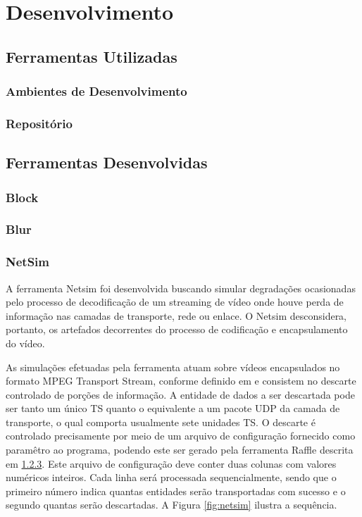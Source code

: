 
\chapter{Desenvolvimento} %

\section{Ferramentas Utilizadas}
\subsection{Ambientes de Desenvolvimento}
\subsection{Repositório}

\section{Ferramentas Desenvolvidas}
\subsection{Block}
\subsection{Blur}
\subsection{NetSim}

A ferramenta Netsim foi desenvolvida buscando simular degradações ocasionadas pelo processo de decodificação de um streaming de vídeo onde houve perda de informação nas camadas de transporte, rede ou enlace. O Netsim desconsidera, portanto, os artefados decorrentes do processo de codificação e encapsulamento do vídeo.

As simulações efetuadas pela ferramenta atuam sobre vídeos encapsulados no formato MPEG Transport Stream, conforme definido em \cite{} %
e consistem no descarte controlado de porções de informação. 
A entidade de dados a ser descartada pode ser tanto um único TS quanto o equivalente a um pacote UDP da camada de transporte, o qual comporta usualmente sete unidades TS.
O descarte é controlado precisamente por meio de um arquivo de configuração fornecido como paramêtro ao programa, podendo este ser gerado pela ferramenta Raffle descrita em \ref{}. %
Este arquivo de configuração deve conter duas colunas com valores numéricos inteiros. 
Cada linha será processada sequencialmente, sendo que o primeiro número indica quantas entidades serão transportadas com sucesso e o segundo quantas serão descartadas. 
A Figura \ref{fig:netsim} ilustra a sequência.

